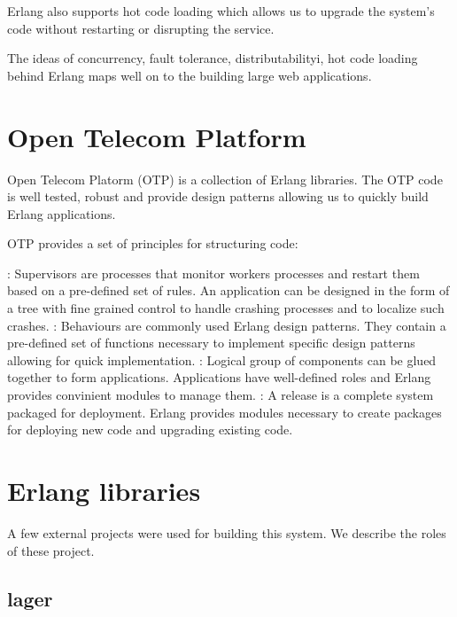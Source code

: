 Erlang also supports hot code loading which allows us to upgrade the system's
code without restarting or disrupting the service.

The ideas of concurrency, fault tolerance, distributabilityi, hot code loading
behind Erlang maps well on to the building large web applications.



\section{Open Telecom Platform}

Open Telecom Platorm (OTP) is a collection of Erlang libraries. The OTP code is
well tested, robust and provide design patterns allowing us to quickly build 
Erlang applications.

OTP provides a set of principles for structuring code:

\begin{itemize}
    : Supervisors are processes that monitor workers 
    processes and restart them based on a pre-defined set of rules. An 
    application can be designed in the form of a tree with fine grained
    control to handle crashing processes and to localize such crashes.
    : Behaviours are commonly used Erlang design patterns.
    They contain a pre-defined set of functions necessary to implement
    specific design patterns allowing for quick implementation.
    : Logical group of components can be glued together
    to form applications. Applications have well-defined roles and Erlang
    provides convinient modules to manage them.
    : A release is a complete system packaged for deployment.
    Erlang provides modules necessary to create packages for deploying new
    code and upgrading existing code.
\end{itemize}


\section{Erlang libraries}

A few external projects were used for building this system. We describe the
roles of these project.

\subsection{lager}

